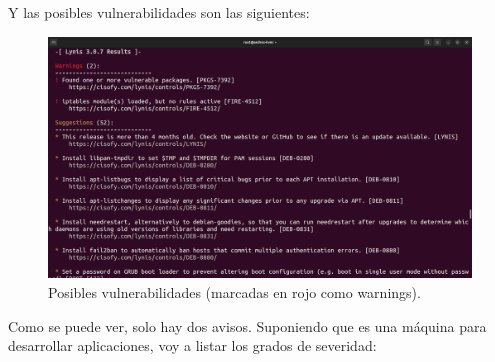 \documentclass{article}
\begin{document}
\newpage

Y las posibles vulnerabilidades son las siguientes:

\begin{figure}[H]
    \includegraphics[width=\textwidth]{imagenes/lyniswarnings1.png}
    \caption{Posibles vulnerabilidades (marcadas en rojo como warnings).}
\end{figure}


Como se puede ver, solo hay dos avisos. Suponiendo que es una máquina para desarrollar aplicaciones, voy a listar los grados de severidad:
\end{document}
